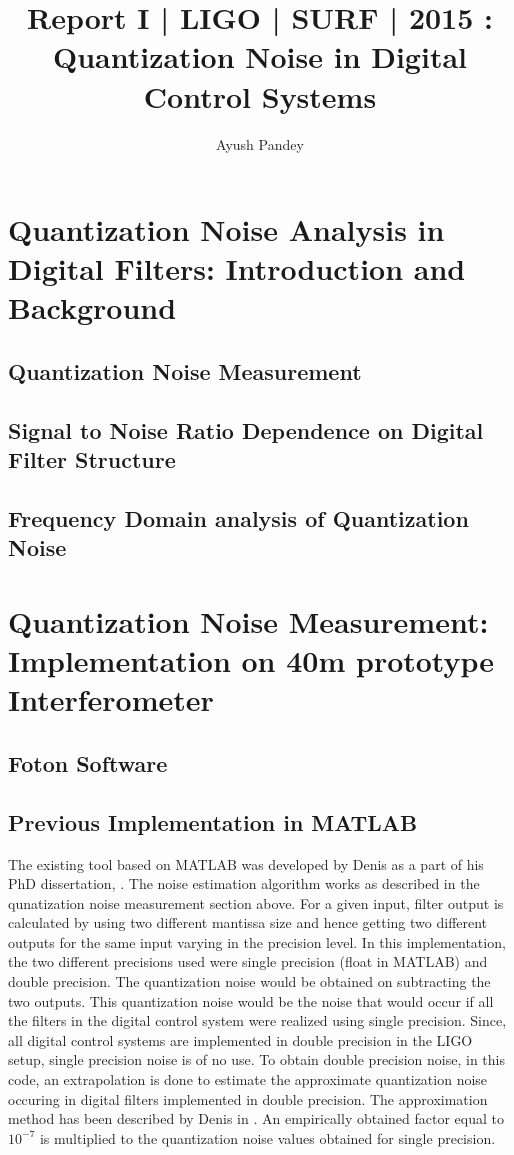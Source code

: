 \documentclass[colorlinks=true,pdfstartview=FitV,linkcolor=blue,
            citecolor=red,urlcolor=magenta]{ligodoc}
\title{Report I | LIGO | SURF | 2015 : Quantization Noise in Digital Control Systems}
\author{Ayush Pandey}
\begin{document}
\section{Quantization Noise Analysis in Digital Filters: Introduction and Background}
	\subsection{Quantization Noise Measurement}
	\subsection{Signal to Noise Ratio Dependence on Digital Filter Structure}
	\subsection{Frequency Domain analysis of Quantization Noise}
\section{Quantization Noise Measurement: Implementation on 40m prototype Interferometer}
	\subsection{Foton Software}
	
	\subsection{Previous Implementation in MATLAB}
	The existing tool based on MATLAB was developed by Denis as a part of his PhD dissertation, \cite{Den_Thesis}. The noise estimation algorithm works as described in the qunatization noise measurement section above. For a given input, filter output is calculated by using two different mantissa size and hence getting two different outputs for the same input varying in the precision level. In this implementation, the two different precisions used were single precision (float in MATLAB) and double precision. The quantization noise would be obtained on subtracting the two outputs. This quantization noise would be the noise that would occur if all the filters in the digital control system were realized using single precision. Since, all digital control systems are implemented in double precision in the LIGO setup, single precision noise is of no use. To obtain double precision noise, in this code, an extrapolation is done to estimate the approximate quantization noise occuring in digital filters implemented in double precision. The approximation method has been described by Denis in \cite{Den_approx}. An empirically obtained factor equal to $10^{-7}$ is multiplied to the quantization noise values obtained for single precision. 
\end{document}
